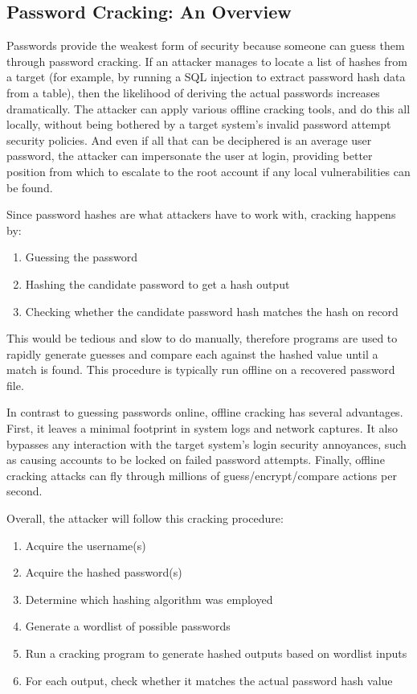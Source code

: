 \subsection{Password Cracking: An Overview}
Passwords provide the weakest form of security because someone can guess them through password cracking. If an attacker manages to locate a list of hashes from a target (for example, by running a SQL injection to extract password hash data from a table), then the likelihood of deriving the actual passwords increases dramatically. The attacker can apply various offline cracking tools, and do this all locally, without being bothered by a target system's invalid password attempt security policies. And even if all that can be deciphered is an average user password, the attacker can impersonate the user at login, providing better position from which to escalate to the root account if any local vulnerabilities can be found.

\noindent
Since password hashes are what attackers have to work with, cracking happens by:
\begin{enumerate}
  \item Guessing the password
  \item Hashing the candidate password to get a hash output
  \item Checking whether the candidate password hash matches the hash on record
\end{enumerate}

\noindent
This would be tedious and slow to do manually, therefore programs are used to rapidly generate guesses and compare each against the hashed value until a match is found. This procedure is typically run offline on a recovered password file.

In contrast to guessing passwords online, offline cracking has several advantages. First, it leaves a minimal footprint in system logs and network captures. It also bypasses any interaction with the target system’s login security annoyances, such as causing accounts to be locked on failed password attempts. Finally, offline cracking attacks can fly through millions of guess/encrypt/compare actions per second.
\newpage

\noindent
Overall, the attacker will follow this cracking procedure:

\begin{enumerate}
  \item Acquire the username(s)
  \item Acquire the hashed password(s)
  \item Determine which hashing algorithm was employed
  \item Generate a wordlist of possible passwords
  \item Run a cracking program to generate hashed outputs based on wordlist inputs
  \item For each output, check whether it matches the actual password hash value
\end{enumerate}


